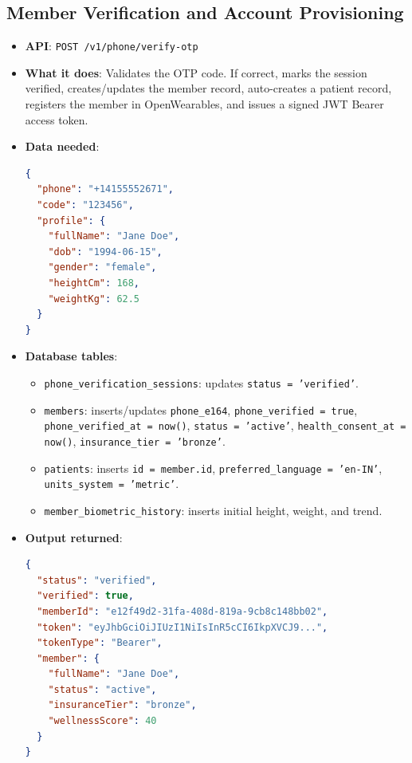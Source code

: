 \documentclass[11pt,a4paper]{article}
\begin{document}
\subsection{Member Verification and Account Provisioning}
\begin{itemize}
    \item \textbf{API}: \texttt{POST /v1/phone/verify-otp}
    \item \textbf{What it does}: Validates the OTP code. If correct, marks the session verified, creates/updates the member record, auto-creates a patient record, registers the member in OpenWearables, and issues a signed JWT Bearer access token.
    \item \textbf{Data needed}:
\begin{lstlisting}[language=json]
{
  "phone": "+14155552671",
  "code": "123456",
  "profile": {
    "fullName": "Jane Doe",
    "dob": "1994-06-15",
    "gender": "female",
    "heightCm": 168,
    "weightKg": 62.5
  }
}
\end{lstlisting}
    \item \textbf{Database tables}:
    \begin{itemize}
        \item \texttt{phone\_verification\_sessions}: updates \texttt{status = 'verified'}.
        \item \texttt{members}: inserts/updates \texttt{phone\_e164}, \texttt{phone\_verified = true}, \texttt{phone\_verified\_at = now()}, \texttt{status = 'active'}, \texttt{health\_consent\_at = now()}, \texttt{insurance\_tier = 'bronze'}.
        \item \texttt{patients}: inserts \texttt{id = member.id}, \texttt{preferred\_language = 'en-IN'}, \texttt{units\_system = 'metric'}.
        \item \texttt{member\_biometric\_history}: inserts initial height, weight, and trend.
    \end{itemize}
    \item \textbf{Output returned}:
\begin{lstlisting}[language=json]
{
  "status": "verified",
  "verified": true,
  "memberId": "e12f49d2-31fa-408d-819a-9cb8c148bb02",
  "token": "eyJhbGciOiJIUzI1NiIsInR5cCI6IkpXVCJ9...",
  "tokenType": "Bearer",
  "member": {
    "fullName": "Jane Doe",
    "status": "active",
    "insuranceTier": "bronze",
    "wellnessScore": 40
  }
}
\end{lstlisting}
\end{itemize}
\end{document}
